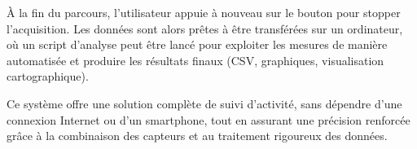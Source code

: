 À la fin du parcours, l’utilisateur appuie à nouveau sur le bouton pour stopper l’acquisition.
Les données sont alors prêtes à être transférées sur un ordinateur, où un script d’analyse peut être lancé pour exploiter les mesures de manière automatisée et produire les résultats finaux (CSV, graphiques, visualisation cartographique).

Ce système offre une solution complète de suivi d’activité, sans dépendre d’une connexion Internet ou d’un smartphone, tout en assurant une précision renforcée grâce à la combinaison des capteurs et au traitement rigoureux des données.

